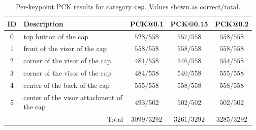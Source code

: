 \begin{table}[h]
\centering
\small
\caption{Per-keypoint PCK results for category \texttt{cap}. Values shown as $\text{correct}/\text{total}$.}
\label{tab:pck_cap}
\begin{tabular}{cl ccc}
\toprule
ID & Description & PCK@0.1 & PCK@0.15 & PCK@0.2 \\
\midrule
0 & top button of the cap & $528/558$ & $557/558$ & $558/558$ \\
1 & front of the visor of the cap & $558/558$ & $558/558$ & $558/558$ \\
2 & corner of the visor of the cap & $481/558$ & $546/558$ & $554/558$ \\
3 & corner of the visor of the cap & $484/558$ & $540/558$ & $555/558$ \\
4 & center of the back of the cap & $555/558$ & $558/558$ & $558/558$ \\
5 & center of the visor attachment of the cap & $493/502$ & $502/502$ & $502/502$ \\
\midrule
\multicolumn{2}{r}{Total} & $3099/3292$ & $3261/3292$ & $3285/3292$ \\
\bottomrule
\end{tabular}
\end{table}

